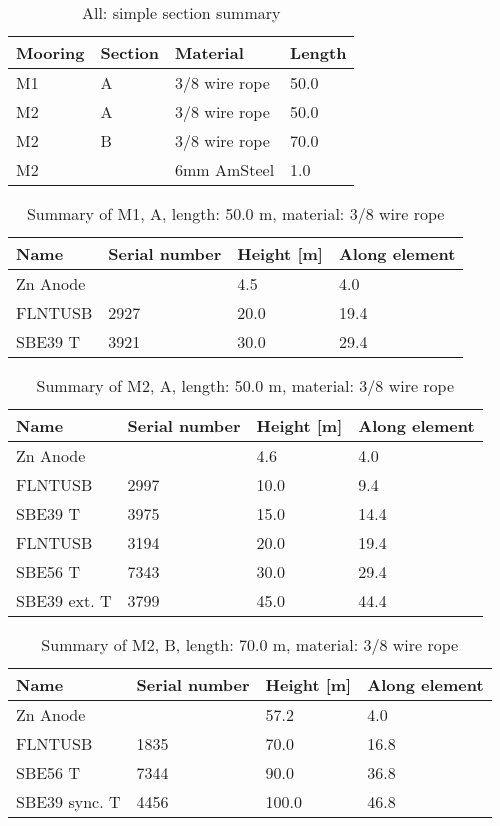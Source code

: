\documentclass{article}
\begin{document}
\begin{table}[!htbp]
\centering
\caption{All: simple section summary}
\begin{tabular}{llll}
\toprule
Mooring & Section & Material & Length \\
\midrule
M1 & A & 3/8 wire rope & 50.0 \\
M2 & A & 3/8 wire rope & 50.0 \\
M2 & B & 3/8 wire rope & 70.0 \\
M2 &  & 6mm AmSteel & 1.0 \\
\bottomrule
\end{tabular}
\end{table}

\begin{table}[!htbp]
\centering
\caption{Summary of M1, A, length: 50.0 m, material: 3/8 wire rope}
\begin{tabular}{llll}
\toprule
Name & Serial number & Height [m] & Along element \\
\midrule
Zn Anode &  & 4.5 & 4.0 \\
FLNTUSB & 2927 & 20.0 & 19.4 \\
SBE39 T & 3921 & 30.0 & 29.4 \\
\bottomrule
\end{tabular}
\end{table}

\begin{table}[!htbp]
\centering
\caption{Summary of M2, A, length: 50.0 m, material: 3/8 wire rope}
\begin{tabular}{llll}
\toprule
Name & Serial number & Height [m] & Along element \\
\midrule
Zn Anode &  & 4.6 & 4.0 \\
FLNTUSB & 2997 & 10.0 & 9.4 \\
SBE39 T & 3975 & 15.0 & 14.4 \\
FLNTUSB & 3194 & 20.0 & 19.4 \\
SBE56 T & 7343 & 30.0 & 29.4 \\
SBE39 ext. T & 3799 & 45.0 & 44.4 \\
\bottomrule
\end{tabular}
\end{table}

\begin{table}[!htbp]
\centering
\caption{Summary of M2, B, length: 70.0 m, material: 3/8 wire rope}
\begin{tabular}{llll}
\toprule
Name & Serial number & Height [m] & Along element \\
\midrule
Zn Anode &  & 57.2 & 4.0 \\
FLNTUSB & 1835 & 70.0 & 16.8 \\
SBE56 T & 7344 & 90.0 & 36.8 \\
SBE39 sync. T & 4456 & 100.0 & 46.8 \\
\bottomrule
\end{tabular}
\end{table}
\end{document}

